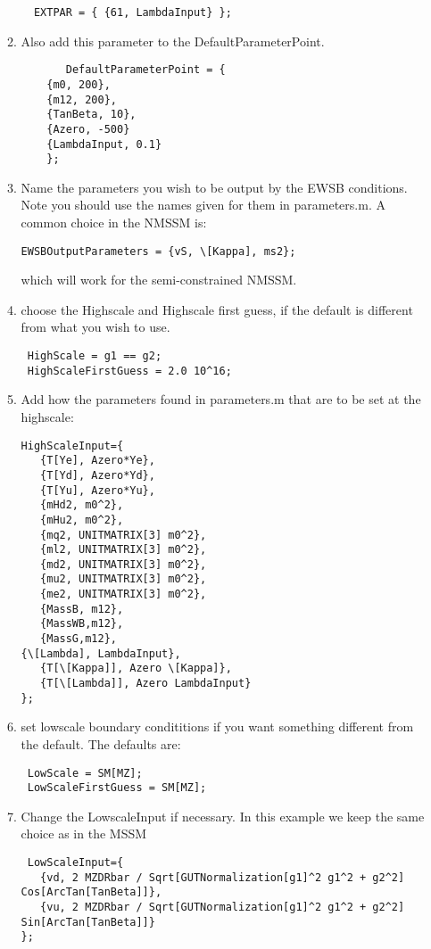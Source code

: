 \documentclass[final,3p,times,pdflatex]{elsarticle}
\begin{document}
\begin{enumerate}
\begin{enumerate}
\begin{lstlisting}
  EXTPAR = { {61, LambdaInput} };
      \end{lstlisting}
     \item Also add this parameter to the DefaultParameterPoint.
      \begin{lstlisting}
       DefaultParameterPoint = {
    {m0, 200},
    {m12, 200},
    {TanBeta, 10},
    {Azero, -500}
    {LambdaInput, 0.1}
    };
  \end{lstlisting}
    \item Name the parameters you wish to be output by the EWSB conditions.  Note you should use the names given for them in parameters.m.    A common choice in the NMSSM is:
\begin{lstlisting}
EWSBOutputParameters = {vS, \[Kappa], ms2};
\end{lstlisting}
which will work for the semi-constrained NMSSM.
\item choose the Highscale and Highscale first guess, if the default is different from what you wish to use.  
\begin{lstlisting} 
 HighScale = g1 == g2;
 HighScaleFirstGuess = 2.0 10^16;
\end{lstlisting}
\item Add how the parameters found in parameters.m that are to be set at the highscale:
\begin{lstlisting} 
HighScaleInput={
   {T[Ye], Azero*Ye},
   {T[Yd], Azero*Yd},
   {T[Yu], Azero*Yu},
   {mHd2, m0^2},
   {mHu2, m0^2},
   {mq2, UNITMATRIX[3] m0^2},
   {ml2, UNITMATRIX[3] m0^2},
   {md2, UNITMATRIX[3] m0^2},
   {mu2, UNITMATRIX[3] m0^2},
   {me2, UNITMATRIX[3] m0^2},
   {MassB, m12},
   {MassWB,m12},
   {MassG,m12},
{\[Lambda], LambdaInput},
   {T[\[Kappa]], Azero \[Kappa]},
   {T[\[Lambda]], Azero LambdaInput}
};
\end{lstlisting}
\item set lowscale boundary condititions if you want something different from the default.  The defaults are:
\begin{lstlisting} 
 LowScale = SM[MZ];
 LowScaleFirstGuess = SM[MZ];
\end{lstlisting}
\item Change the LowscaleInput if necessary.  In this example we keep the same choice as in the MSSM
  \begin{lstlisting} 
 LowScaleInput={
   {vd, 2 MZDRbar / Sqrt[GUTNormalization[g1]^2 g1^2 + g2^2] Cos[ArcTan[TanBeta]]},
   {vu, 2 MZDRbar / Sqrt[GUTNormalization[g1]^2 g1^2 + g2^2] Sin[ArcTan[TanBeta]]}
};
  \end{lstlisting}


\end{enumerate}
\end{enumerate}
\end{document}
